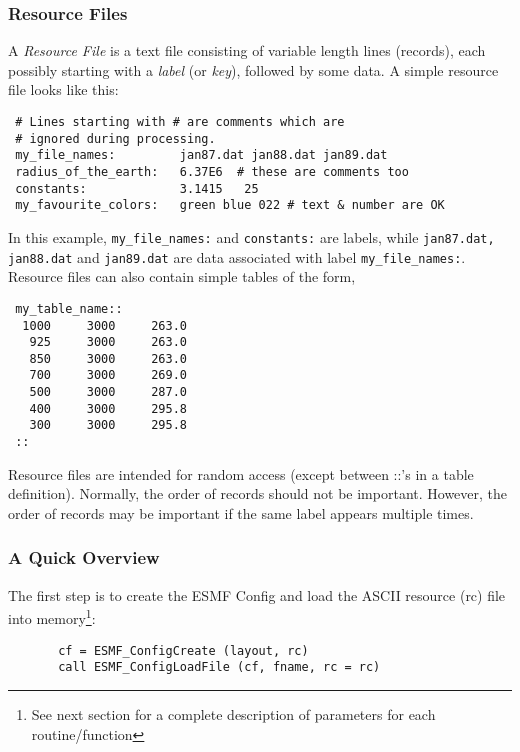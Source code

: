 
 \subsubsection{Resource Files}

      A {\em Resource File} is a text file consisting of variable
     length lines (records), each possibly starting with a {\em label}
     (or {\em key}), followed by some data. A simple resource file 
     looks like this:

 \begin{verbatim}
 # Lines starting with # are comments which are
 # ignored during processing.
 my_file_names:         jan87.dat jan88.dat jan89.dat
 radius_of_the_earth:   6.37E6  # these are comments too
 constants:             3.1415   25
 my_favourite_colors:   green blue 022 # text & number are OK
 \end{verbatim}

    In this example, {\tt my\_file\_names:} and {\tt constants:}
    are labels, while {\tt jan87.dat, jan88.dat} and {\tt jan89.dat} are
    data associated with label {\tt my\_file\_names:}.
    Resource files can also contain simple tables of the form,

 \begin{verbatim}
 my_table_name::
  1000     3000     263.0   
   925     3000     263.0
   850     3000     263.0
   700     3000     269.0
   500     3000     287.0
   400     3000     295.8
   300     3000     295.8    
 ::
 \end{verbatim}

 Resource files are intended for random access (except between ::'s in a 
 table definition). Normally, the order of records should not be important. 
 However, the order of records may be important if the same label appears 
 multiple times.

    \subsubsection{A Quick Overview}

    The first step is to create the ESMF Config and load the 
    ASCII resource (rc) file into memory\footnote{See next section 
    for a complete description of parameters for each routine/function}:

 \begin{verbatim}
       cf = ESMF_ConfigCreate (layout, rc)
       call ESMF_ConfigLoadFile (cf, fname, rc = rc)
 \end{verbatim}

